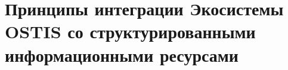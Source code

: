 \section{Принципы интеграции Экосистемы OSTIS со структурированными информационными ресурсами}
{\label{sec_integration_resources}} 

